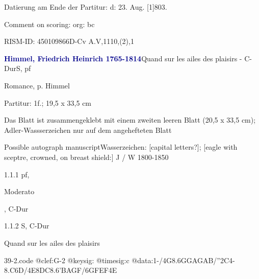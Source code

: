 \documentclass[a4paper, twocolumn, 11pt]{book}
\begin{document}
\newline %
\par Datierung am Ende der Partitur: {\textquotedbl}d: 23. Aug. [1]803.{\textquotedbl}
\par Comment on scoring: org: bc
\par RISM-ID: 450109866\newline D-Cv  A.V,1110,(2),1
\par \vspace{16pt} \textcolor{darkblue}{\textbf{Himmel, Friedrich Heinrich  1765-1814}}\hfillplus{[39]}\newline Quand sur les ailes des plaisirs - C-Dur\newline S, pf
\par \begin{itshape} Romance, p. Himmel\end{itshape} 
\par \textcolor{darkblue}{}  Partitur: 1f.; 19,5 x 33,5 cm\newline \begin{small} Das Blatt ist zusammengeklebt mit einem zweiten leeren Blatt (20,5 x 33,5 cm); Adler-Wassserzeichen nur auf dem angehefteten Blatt\end{small} \newline Possible autograph manuscript\newline Wasserzeichen: [capital letters?]; [eagle with sceptre, crowned, on breast shield:] J / W  1800-1850
\par 1.1.1  pf, \begin{itshape}Moderato\end{itshape}, C-Dur  
\begin{filecontents*}{39-1.code}
@clef:G-2
@keysig:
@timesig:c
@data:''2.C4-/'8-E-E-F-F/-E-E-{EG''C}/EEDC}{'BAGF}/
\end{filecontents*}

\newline %
\par 1.1.2  S, C-Dur\newline \begin{footnotesize} Quand sur les ailes des plaisirs \end{footnotesize}  
\begin{filecontents*}{39-2.code}
@clef:G-2
@keysig:
@timesig:c
@data:1-/4G8.6GGAGAB/''2C4-{8.C6D}/4E8DC8.6'{BA}GF/6{GFEF}4E
\end{filecontents*}
\end{document}
